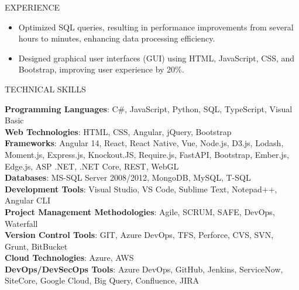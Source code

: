 \documentclass{resume} %
\begin{document}
\begin{rSection}{EXPERIENCE}
\begin{flushleft}
\begin{itemize}
                                    \item Optimized SQL queries, resulting in performance improvements from several hours to minutes, enhancing data processing efficiency.
                                    \item Designed graphical user interfaces (GUI) using HTML, JavaScript, CSS, and Bootstrap, improving user experience by 20\%.
                            \end{itemize}
            \vspace{0.5em}
            \end{flushleft} 
\end{rSection}

\begin{rSection}{TECHNICAL SKILLS}
    \begin{flushleft}
                    \textbf{Programming Languages}: C\#, JavaScript, Python, SQL, TypeScript, Visual Basic \\
                    \textbf{Web Technologies}: HTML, CSS, Angular, jQuery, Bootstrap \\
                    \textbf{Frameworks}: Angular 14, React, React Native, Vue, Node.js, D3.js, Lodash, Moment.js, Express.js, Knockout.JS, Require.js, FastAPI, Bootstrap, Ember.js, Edge.js, ASP .NET, .NET Core, REST, WebGL \\
                    \textbf{Databases}: MS{-}SQL Server 2008/2012, MongoDB, MySQL, T{-}SQL \\
                    \textbf{Development Tools}: Visual Studio, VS Code, Sublime Text, Notepad++, Angular CLI \\
                    \textbf{Project Management Methodologies}: Agile, SCRUM, SAFE, DevOps, Waterfall \\
                    \textbf{Version Control Tools}: GIT, Azure DevOps, TFS, Perforce, CVS, SVN, Grunt, BitBucket \\
                    \textbf{Cloud Technologies}: Azure, AWS \\
                    \textbf{DevOps/DevSecOps Tools}: Azure DevOps, GitHub, Jenkins, ServiceNow, SiteCore, Google Cloud, Big Query, Confluence, JIRA \\
            \end{flushleft}
\end{rSection}
\end{document}
